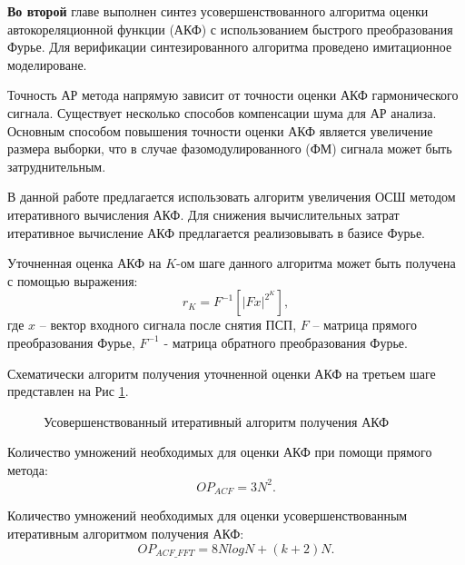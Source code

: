 {\bf{Во второй}} главе выполнен синтез усовершенствованного алгоритма оценки автокореляционной функции (АКФ) с использованием
быстрого преобразования Фурье. Для верификации синтезированного алгоритма проведено имитационное моделироване.

Точность АР метода напрямую зависит от точности оценки АКФ гармонического сигнала.
Существует несколько способов компенсации шума для АР анализа.
Основным способом повышения точности оценки АКФ является увеличение размера выборки, что в случае фазомодулированного (ФМ) сигнала может быть затруднительным. 

В данной работе предлагается использовать алгоритм увеличения ОСШ методом итеративного вычисления АКФ.
Для снижения вычислительных затрат итеративное вычисление АКФ предлагается реализовывать в базисе Фурье. 

Уточненная оценка АКФ на ${K}$-ом шаге данного алгоритма может быть получена с помощью выражения:
\begin{equation}
	\label{eq:akf_3}
	\hat{r}_K = F^{-1}\left[ \left| Fx \right| ^{2^K} \right],
\end{equation}
где ${x}$ – вектор входного сигнала после снятия ПСП, ${F}$ – матрица прямого преобразования Фурье,
${F^{-1}}$ - матрица обратного преобразования Фурье.

Схематически алгоритм получения уточненной оценки АКФ на третьем шаге представлен на Рис \ref{pic:akf_pic}.
\begin{figure}[h]
	\center{}
	\caption{Усовершенствованный итеративный алгоритм получения АКФ}
	\label{pic:akf_pic}
\end{figure}

Количество умножений необходимых для оценки АКФ при помощи прямого метода:
\begin{equation}
	OP_{ACF} = 3N^2.
\end{equation}

Количество умножений необходимых для оценки усовершенствованным итеративным алгоритмом получения АКФ:
\begin{equation}
	OP_{ACF\_FFT} = 8NlogN + (k+2)N.
\end{equation}


